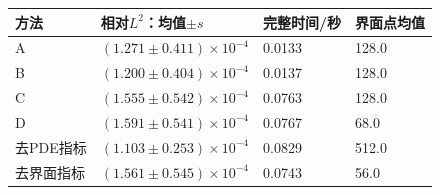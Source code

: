 \begin{tabular}{llll}\toprule
方法 & 相对$L^2$：均值$\pm s$ & 完整时间/秒 & 界面点均值 \\ \midrule
A & $(1.271\pm0.411)\times10^{-4}$ & 0.0133 & 128.0 \\
B & $(1.200\pm0.404)\times10^{-4}$ & 0.0137 & 128.0 \\
C & $(1.555\pm0.542)\times10^{-4}$ & 0.0763 & 128.0 \\
D & $(1.591\pm0.541)\times10^{-4}$ & 0.0767 & 68.0 \\
去PDE指标 & $(1.103\pm0.253)\times10^{-4}$ & 0.0829 & 512.0 \\
去界面指标 & $(1.561\pm0.545)\times10^{-4}$ & 0.0743 & 56.0 \\
\bottomrule\end{tabular}
